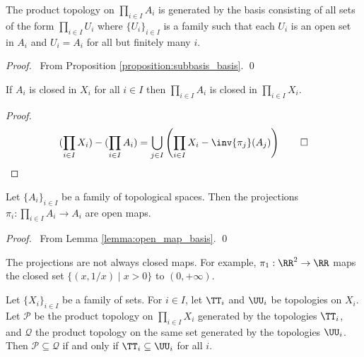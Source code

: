 \begin{proposition}
    \label{proposition:product_basis}
    The product topology on $\prod_{i \in I} A_i$ is generated by the basis consisting of all sets of the form $\prod_{i \in I} U_i$
    where $\{ U_i \}_{i \in I}$ is a family such that each $U_i$ is an open set in $A_i$ and $U_i = A_i$ for all but finitely many $i$.
\end{proposition}

\begin{proof}
    \pf\ From Proposition \ref{proposition:subbasis_basis}. \qed
\end{proof}

\begin{proposition}
    \label{proposition:closed_product}
    If $A_i$ is closed in $X_i$ for all $i \in I$ then $\prod_{i \in I} A_i$ is closed in $\prod_{i \in I} X_i$.
\end{proposition}

\begin{proof}
    \pf
    \[ (\prod_{i \in I} X_i) - (\prod_{i \in I} A_i) = \bigcup_{j \in I} \left( \prod_{i \in I} X_i - \inv{\pi_j}(A_j) \right) \qed \]
\end{proof}

\begin{proposition}
    \label{proposition:open_map_projections}
    Let $\{ A_i \}_{i \in I}$ be a family of topological spaces. Then the projections $\pi_i : \prod_{i \in I} A_i \rightarrow A_i$ are open maps.
\end{proposition}

\begin{proof}
    \pf\ From Lemma \ref{lemma:open_map_basis}. \qed
\end{proof}

\begin{example}
    The projections are not always closed maps. For example, $\pi_1 : \RR^2 \rightarrow \RR$ maps the closed set $\{ (x,1/x) \mid x > 0 \}$ to $(0, + \infty)$.
\end{example}

\begin{proposition}
    Let $\{ X_i \}_{i \in I}$ be a family of sets. For $i \in I$, let $\TT_i$ and $\UU_i$ be topologies
    on $X_i$. Let $\mathcal{P}$ be the product topology on $\prod_{i \in I} X_i$ generated by
    the topologies $\TT_i$, and $\mathcal{Q}$ the product topology on the same set generated by the topologies
    $\UU_i$. Then $\mathcal{P} \subseteq \mathcal{Q}$ if and only if $\TT_i \subseteq \UU_i$ for all $i$.
\end{proposition}

